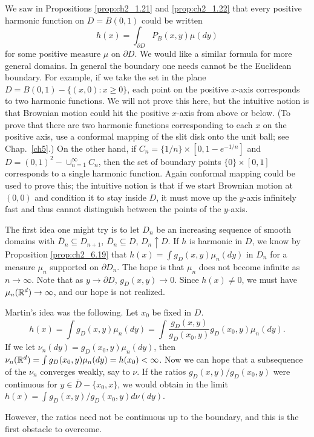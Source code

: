 We saw in Propositions \ref{prop:ch2_1.21} and \ref{prop:ch2_1.22} that every positive harmonic function on $D = B(0,1)$ could be written
\[
    h(x) = \int_{\partial D} P_B(x,y)\mu(dy)
\]
for some positive measure $\mu$ on $\partial D$. We would like a similar formula for more general domains. In general the boundary one needs cannot be the Euclidean boundary. For example, if we take the set in the plane $D = B(0,1) - \{(x,0) : x \geq 0\}$, each point on the positive $x$-axis corresponds to two harmonic functions. We will not prove this here, but the intuitive notion is that Brownian motion could hit the positive $x$-axis from above or below. (To prove that there are two harmonic functions corresponding to each $x$ on the positive axis, use a conformal mapping of the slit disk onto the unit ball; see Chap.\ \ref{ch5}.) On the other hand, if $C_n = \{1/n\} \times [0,1-e^{-1/n}]$ and $D = (0,1)^2 - \cup_{n=1}^\infty C_n$, then the set of boundary points $\{0\} \times [0,1]$ corresponds to a single harmonic function. Again conformal mapping could be used to prove this; the intuitive notion is that if we start Brownian motion at $(0,0)$ and condition it to stay inside $D$, it must move up the $y$-axis infinitely fast and thus cannot distinguish between the points of the $y$-axis.

The first idea one might try is to let $D_n$ be an increasing sequence of smooth domains with $\overline{D}_n \subseteq D_{n+1}$, $\overline{D}_n \subseteq D$, $D_n \uparrow D$. If $h$ is harmonic in $D$, we know by Proposition \ref{prop:ch2_6.19} that $h(x) = \int g_D(x,y)\mu_n(dy)$ in $D_n$ for a measure $\mu_n$ supported on $\partial D_n$. The hope is that $\mu_n$ does not become infinite as $n \to \infty$. Note that as $y \to \partial D$, $g_D(x,y) \to 0$. Since $h(x) \neq 0$, we must have $\mu_n(\mathbb{R}^d) \to \infty$, and our hope is not realized.

Martin's idea was the following. Let $x_0$ be fixed in $D$.
\[
    h(x) = \int g_D(x,y)\mu_n(dy) = \int \frac{g_D(x,y)}{g_D(x_0,y)}g_D(x_0,y)\mu_n(dy).
\]
If we let $\nu_n(dy) = g_D(x_0,y)\mu_n(dy)$, then $\nu_n(\mathbb{R}^d) = \int g_D(x_0,y)\mu_n(dy)=h(x_0) < \infty$. Now we can hope that a subsequence of the $\nu_n$ converges weakly,
say to $\nu$. If the ratios $g_D(x,y)/g_D(x_0,y)$ were continuous for $y \in \overline{D}-\{x_0,x\}$,
we would obtain in the limit $h(x) = \int g_D(x,y)/g_D(x_0,y)d\nu(dy)$.

However, the ratios need not be continuous up to the boundary, and
this is the first obstacle to overcome.

